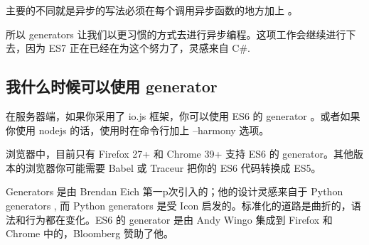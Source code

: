       主要的不同就是异步的写法必须在每个调用异步函数的地方加上  。

      所以 generators 让我们以更习惯的方式去进行异步编程。这项工作会继续进行下去，因为 ES7 正在已经在为这个努力了，灵感来自 C\#.

   \subsection{我什么时候可以使用 generator}
     \label{subsec:我什么时候可以使用_generator}
        在服务器端，如果你采用了 io.js 框架，你可以使用 ES6 的 generator 。或者如果你使用 nodejs 的话，使用时在命令行加上 --harmony 选项。

        浏览器中，目前只有 Firefox 27+ 和 Chrome 39+ 支持 ES6 的 generator。其他版本的浏览器你可能需要 Babel 或 Traceur 把你的 ES6 代码转换成 ES5。

        Generators 是由 Brendan Eich 第一p次引入的；他的设计灵感来自于 Python generators , 而 Python generators 是受 Icon 启发的。标准化的道路是曲折的，语法和行为都在变化。ES6 的 generator 是由 Andy Wingo 集成到 Firefox 和 Chrome 中的，Bloomberg 赞助了他。
